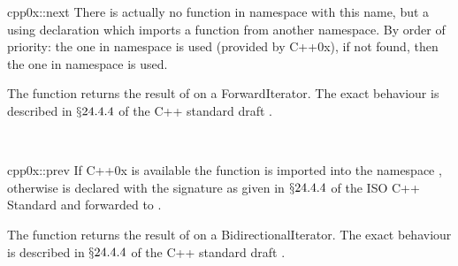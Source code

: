 

\begin{ccRefFunction}{cpp0x::next}
  \label{sectionNext}
  \label{sectionGenericFunctions}
  There is actually no function in namespace  with
  this name, but a using declaration which imports a function from
  another namespace. By order of priority: the one in namespace
   is used (provided by C++0x), if not found, then the one in
  namespace  is used.

  \ccDefinition The function returns the result of  on
  a ForwardIterator. The exact behaviour is described in $\mathsection
  24.4.4$ of the C++ standard draft
  .


  \ccSeeAlso
   \\

\end{ccRefFunction}

\begin{ccRefFunction}{cpp0x::prev}
  \label{sectionPrev}
  \label{sectionGenericFunctions}
  If C++0x is available the function  is imported into
  the namespace , otherwise  is declared with the
  signature as given in $\mathsection 24.4.4$ of the ISO C++ Standard
  and forwarded to .

  \ccDefinition The function returns the result of  on
  a BidirectionalIterator. The exact behaviour is described in
  $\mathsection 24.4.4$ of the C++ standard draft
  .


  \ccSeeAlso
   \\

\end{ccRefFunction}

